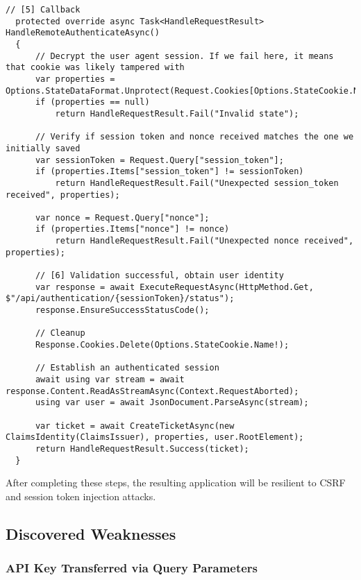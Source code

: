 \begin{lstlisting}[caption={Handling access token creation}, label={lst:dokobit-handleremote}]
  // [5] Callback
  protected override async Task<HandleRequestResult> HandleRemoteAuthenticateAsync()
  {
      // Decrypt the user agent session. If we fail here, it means that cookie was likely tampered with
      var properties = Options.StateDataFormat.Unprotect(Request.Cookies[Options.StateCookie.Name!]);
      if (properties == null)
          return HandleRequestResult.Fail("Invalid state");
  
      // Verify if session token and nonce received matches the one we initially saved
      var sessionToken = Request.Query["session_token"];
      if (properties.Items["session_token"] != sessionToken)
          return HandleRequestResult.Fail("Unexpected session_token received", properties);

      var nonce = Request.Query["nonce"];
      if (properties.Items["nonce"] != nonce)
          return HandleRequestResult.Fail("Unexpected nonce received", properties);
  
      // [6] Validation successful, obtain user identity
      var response = await ExecuteRequestAsync(HttpMethod.Get, $"/api/authentication/{sessionToken}/status");
      response.EnsureSuccessStatusCode();
  
      // Cleanup
      Response.Cookies.Delete(Options.StateCookie.Name!);
  
      // Establish an authenticated session
      await using var stream = await response.Content.ReadAsStreamAsync(Context.RequestAborted);
      using var user = await JsonDocument.ParseAsync(stream);
  
      var ticket = await CreateTicketAsync(new ClaimsIdentity(ClaimsIssuer), properties, user.RootElement);
      return HandleRequestResult.Success(ticket);
  }
\end{lstlisting}

After completing these steps, the resulting application will be resilient to CSRF and session token injection attacks.

\subsection{Discovered Weaknesses}

\subsubsection{API Key Transferred via Query Parameters}

